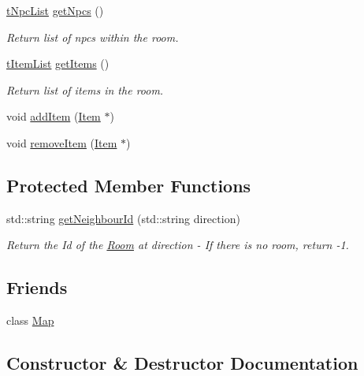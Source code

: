 \begin{DoxyCompactItemize}
\mbox{\hyperlink{_room_8h_af9e617d8fa018c922a1e9748f7e046f9}{t\+Npc\+List}} \mbox{\hyperlink{class_room_a69f8d248898224ab463b686e37608155}{get\+Npcs}} ()
\begin{DoxyCompactList}\small\item\em Return list of npcs within the room. \end{DoxyCompactList}\item 
\mbox{\hyperlink{_room_8h_a2b991bc4061fac67565cc6be66a568ac}{t\+Item\+List}} \mbox{\hyperlink{class_room_a0a6d6e48cb9f69f250b5b59c3f2ddc54}{get\+Items}} ()
\begin{DoxyCompactList}\small\item\em Return list of items in the room. \end{DoxyCompactList}\item 
void \mbox{\hyperlink{class_room_a25c9e7d11f19d950e8dee493e2fa0a54}{add\+Item}} (\mbox{\hyperlink{class_item}{Item}} $\ast$)
\item 
void \mbox{\hyperlink{class_room_a1d24e0d3f909e101b6a884ccab081a52}{remove\+Item}} (\mbox{\hyperlink{class_item}{Item}} $\ast$)
\end{DoxyCompactItemize}
\subsection*{Protected Member Functions}
\begin{DoxyCompactItemize}
\item 
std\+::string \mbox{\hyperlink{class_room_a9418b46d33d52d5eecba639ca59e66f0}{get\+Neighbour\+Id}} (std\+::string direction)
\begin{DoxyCompactList}\small\item\em Return the Id of the \mbox{\hyperlink{class_room}{Room}} at direction -\/ If there is no room, return -\/1. \end{DoxyCompactList}\end{DoxyCompactItemize}
\subsection*{Friends}
\begin{DoxyCompactItemize}
\item 
class \mbox{\hyperlink{class_room_ad2f32e921244459f7cc6d50355429cc6}{Map}}
\end{DoxyCompactItemize}


\subsection{Constructor \& Destructor Documentation}
\mbox{\label{class_room_a08ec9bd6f436a8a99c499e930da7359c}} 
